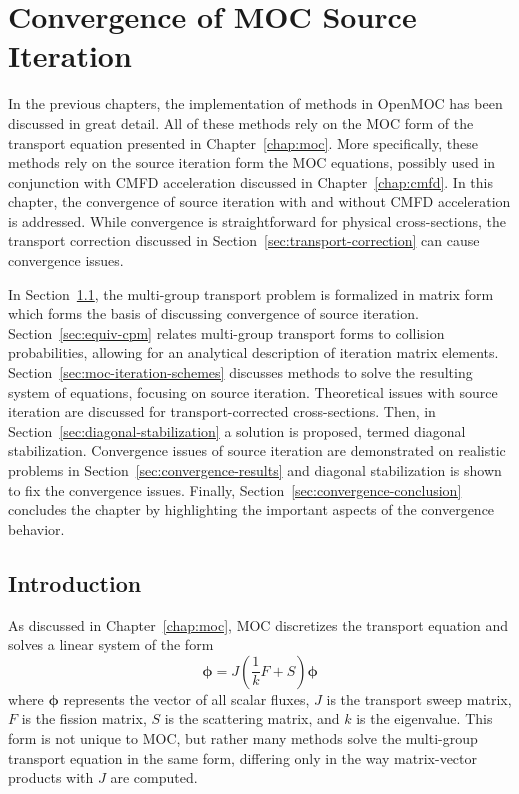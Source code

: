 \chapter{Convergence of MOC Source Iteration}
\label{chap:moc-convergence}

In the previous chapters, the implementation of methods in OpenMOC has been discussed in great detail. All of these methods rely on the \ac{MOC} form of the transport equation presented in Chapter~\ref{chap:moc}. More specifically, these methods rely on the source iteration form the \ac{MOC} equations, possibly used in conjunction with \ac{CMFD} acceleration discussed in Chapter~\ref{chap:cmfd}. In this chapter, the convergence of source iteration with and without \ac{CMFD} acceleration is addressed. While convergence is straightforward for physical cross-sections, the transport correction discussed in Section~\ref{sec:transport-correction} can cause convergence issues. 

In Section~\ref{sec:source-iteration-intro}, the multi-group transport problem is formalized in matrix form which forms the basis of discussing convergence of source iteration. Section~\ref{sec:equiv-cpm} relates multi-group transport forms to collision probabilities, allowing for an analytical description of iteration matrix elements. Section~\ref{sec:moc-iteration-schemes} discusses methods to solve the resulting system of equations, focusing on source iteration. Theoretical issues with source iteration are discussed for transport-corrected cross-sections. Then, in Section~\ref{sec:diagonal-stabilization} a solution is proposed, termed diagonal stabilization. Convergence issues of source iteration are demonstrated on realistic problems in Section~\ref{sec:convergence-results} and diagonal stabilization is shown to fix the convergence issues. Finally, Section~\ref{sec:convergence-conclusion} concludes the chapter by highlighting the important aspects of the convergence behavior.

\section{Introduction}
\label{sec:source-iteration-intro}

As discussed in Chapter~\ref{chap:moc}, \ac{MOC} discretizes the transport equation and solves a linear system of the form
\begin{equation}
	\boldsymbol{\phi} = J \left(\frac{1}{k} F + S \right) \boldsymbol{\phi}
	\label{eq:si-transport}
\end{equation}
where $\boldsymbol{\phi}$ represents the vector of all scalar fluxes, $J$ is the transport sweep matrix, $F$ is the fission matrix, $S$ is the scattering matrix, and $k$ is the eigenvalue. This form is not unique to \ac{MOC}, but rather many methods solve the multi-group transport equation in the same form, differing only in the way matrix-vector products with $J$ are computed.

